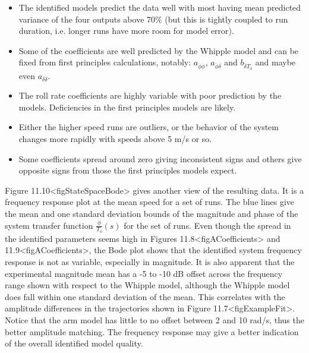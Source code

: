 \documentclass[a4paper]{article}
\begin{document}
\begin{itemize}
  \item
    The identified models predict the data well with most having mean
    predicted variance of the four outputs above 70\% (but this is tightly
    coupled to run duration, i.e. longer runs have more room for model
    error).
  \item
    Some of the coefficients are well predicted by the Whipple model and
    can be fixed from first principles calculations, notably:
    $a_{\ddot{\phi}\phi}$, $a_{\ddot{\phi}\delta}$ and
    $b_{\ddot{\delta}T_\delta}$ and maybe even $a_{\ddot{\delta}\delta}$.
  \item
    The roll rate coefficients are highly variable with poor prediction by
    the models. Deficiencies in the first principles models are likely.
  \item
    Either the higher speed runs are outliers, or the behavior of the
    system changes more rapidly with speeds above 5 m/s or so.
  \item
    Some coefficients spread around zero giving inconsistent signs and
    others give opposite signs from those the first principles models
    expect.
\end{itemize}



Figure 11.10\textless{}figStateSpaceBode\textgreater{} gives another
view of the resulting data. It is a frequency response plot at the mean
speed for a set of runs. The blue lines give the mean and one standard
deviation bounds of the magnitude and phase of the system transfer
function $\frac{\phi}{T_\delta}(s)$ for the set of runs. Even though the
spread in the identified parameters seems high in Figures
11.8\textless{}figACoefficients\textgreater{} and
11.9\textless{}figACoefficients\textgreater{}, the Bode plot shows that
the identified system frequency response is not as variable, especially
in magnitude. It is also apparent that the experimental magnitude mean
has a -5 to -10 dB offset across the frequency range shown with respect
to the Whipple model, although the Whipple model does fall within one
standard deviation of the mean. This correlates with the amplitude
differences in the trajectories shown in
Figure 11.7\textless{}figExampleFit\textgreater{}. Notice that the arm
model has little to no offset between 2 and 10 rad/s, thus the better
amplitude matching. The frequency response may give a better indication
of the overall identified model quality.
\end{document}
